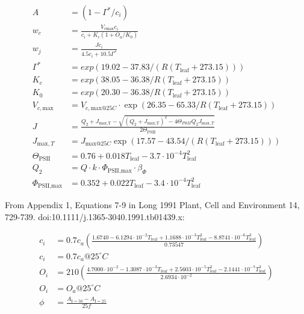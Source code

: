\documentclass[10pt]{article}
\begin{document}
\begin{align}
A &= \left(1-\Gamma^\ast/c_i\right) \\
w_c &= \frac{V_{c\text{max}}c_i}{c_i+K_c(1+O_a/K_0)}\\
w_j &= \frac{Jc_i}{4.5c_i + 10.5\Gamma^{*}}\\
\Gamma^\ast &= exp(19.02 - 37.83/(R(T_\text{leaf}+273.15)))\\
K_c &= exp(38.05-36.38/R(T_\text{leaf}+273.15))\\
K_0&=exp(20.30-36.38/R(T_\text{leaf}+273.15))\\
V_{c,\text{max}}&=V_{c,\text{max}@25C}\cdot \exp(26.35-65.33/R(T_\text{leaf}+273.15))\\
J&=\frac{Q_2+J_\text{max,T}-\sqrt{(Q_2+J_\text{max,T})^2-4\Theta_{PSII}Q_2J_{\text{max},T}}}{2\Theta_{\text{PSII}}}\\
J_{\text{max},T}&=J_{\text{max}@25C}\exp(17.57-43.54/(R(T_\text{leaf}+273.15))) \\
\Theta_\text{PSII} &= 0.76+0.018T_\text{leaf}-3.7\cdot10^{-4}T_\text{leaf}^2\\
Q_2&=Q\cdot k\cdot \Phi_\text{PSII,max}\cdot\beta_\Phi\\
\Phi_\text{PSII,max}&= 0.352 + 0.022T_\text{leaf} - 3.4\cdot10^{-4} T_\text{leaf}^2
\end{align}

From Appendix 1, Equations 7-9 in Long 1991 Plant, Cell and Environment 14, 729-739. doi:10.1111/j.1365-3040.1991.tb01439.x:

\begin{align}
c_i &= 0.7c_a\left(\frac{1.6740-6.1294\cdot10^{-2}T_\text{leaf}+1.1688\cdot10^{-3}T_\text{leaf}^2-8.8741\cdot10^{-6}T_\text{leaf}^3}{0.73547}\right)\\
c_i&=0.7c_a @ 25^{\circ}C \\
O_i&=210\left(\frac{4.7000\cdot10^{-2}-1.3087\cdot10^{-3}T_\text{leaf}+2.5603\cdot10^{-5}T_\text{leaf}^2-2.1441\cdot10^{-7}T_\text{leaf}^3}{2.6934\cdot10^{-2}}\right)\\
O_i&=O_a  @ 25^{\circ}C\\
\phi&=\frac{A_{\text{I}=50}-A_{\text{I}=25}}{25f}
\end{align}
\end{document}
